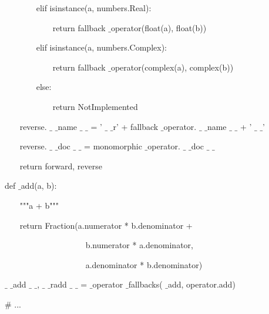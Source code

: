 \documentclass[a4paper,12pt]{report}
\begin{document}
\noindent 
~~~~~~~ elif isinstance(a, numbers.Real): \par
\noindent 
~~~~~~~~~~~ return fallback $  \_  $operator(float(a), float(b)) \par
\noindent 
~~~~~~~ elif isinstance(a, numbers.Complex): \par
\noindent 
~~~~~~~~~~~ return fallback $  \_  $operator(complex(a), complex(b)) \par
\noindent 
~~~~~~~ else: \par
\noindent 
~~~~~~~~~~~ return NotImplemented \par
\noindent 
~~~ reverse. $  \_  $ $  \_  $name $  \_  $ $  \_  $ = ' $  \_  $ $  \_  $r' + fallback $  \_  $operator. $  \_  $ $  \_  $name $  \_  $ $  \_  $ + ' $  \_  $ $  \_  $' \par
\noindent 
~~~ reverse. $  \_  $ $  \_  $doc $  \_  $ $  \_  $ = monomorphic $  \_  $operator. $  \_  $ $  \_  $doc $  \_  $ $  \_  $ \par
\noindent 
\vspace{12pt}
\noindent 
~~~ return forward, reverse \par
\noindent 
\vspace{12pt}
\noindent 
def  $  \_  $add(a, b): \par
\noindent 
~~~ """a + b""" \par
\noindent 
~~~ return Fraction(a.numerator * b.denominator + \par
\noindent 
~~~~~~~~~~~~~~~~~~~ b.numerator * a.denominator, \par
\noindent 
~~~~~~~~~~~~~~~~~~~ a.denominator * b.denominator) \par
\noindent 
\vspace{12pt}
\noindent 
 $  \_  $ $  \_  $add $  \_  $ $  \_  $,  $  \_  $ $  \_  $radd $  \_  $ $  \_  $ =  $  \_  $operator $  \_  $fallbacks( $  \_  $add, operator.add) \par
\noindent 
\vspace{12pt}
\noindent 
 $  \#  $ ... \par
\vspace{12pt}
\end{document}
